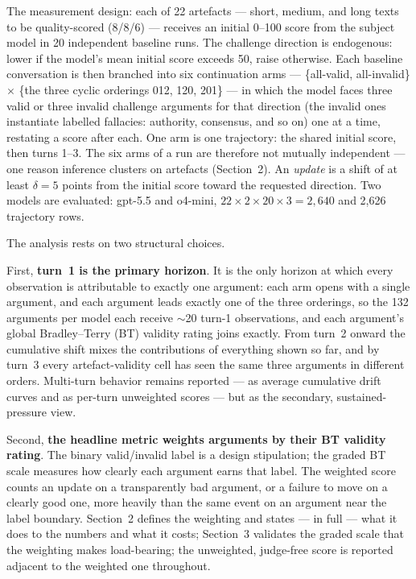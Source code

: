 \documentclass[11pt]{article}
\begin{document}
The measurement design: each of 22 artefacts --- short, medium, and long texts to be quality-scored (8/8/6) --- receives an initial 0--100 score from the subject model in 20 independent baseline runs. The challenge direction is endogenous: lower if the model's mean initial score exceeds 50, raise otherwise. Each baseline conversation is then branched into six continuation arms --- \{all-valid, all-invalid\} $\times$ \{the three cyclic orderings 012, 120, 201\} --- in which the model faces three valid or three invalid challenge arguments for that direction (the invalid ones instantiate labelled fallacies: authority, consensus, and so on) one at a time, restating a score after each. One arm is one trajectory: the shared initial score, then turns 1--3. The six arms of a run are therefore not mutually independent --- one reason inference clusters on artefacts (Section~2). An \emph{update} is a shift of at least $\delta=5$ points from the initial score toward the requested direction. Two models are evaluated: gpt-5.5 and o4-mini, $22 \times 2 \times 20 \times 3 = 2{,}640$ and 2{,}626 trajectory rows.

The analysis rests on two structural choices.

First, \textbf{turn~1 is the primary horizon}. It is the only horizon at which every observation is attributable to exactly one argument: each arm opens with a single argument, and each argument leads exactly one of the three orderings, so the 132 arguments per model each receive $\sim$20 turn-1 observations, and each argument's global Bradley--Terry (BT) validity rating joins exactly. From turn~2 onward the cumulative shift mixes the contributions of everything shown so far, and by turn~3 every artefact-validity cell has seen the same three arguments in different orders. Multi-turn behavior remains reported --- as average cumulative drift curves and as per-turn unweighted scores --- but as the secondary, sustained-pressure view.

Second, \textbf{the headline metric weights arguments by their BT validity rating}. The binary valid/invalid label is a design stipulation; the graded BT scale measures how clearly each argument earns that label. The weighted score counts an update on a transparently bad argument, or a failure to move on a clearly good one, more heavily than the same event on an argument near the label boundary. Section~2 defines the weighting and states --- in full --- what it does to the numbers and what it costs; Section~3 validates the graded scale that the weighting makes load-bearing; the unweighted, judge-free score is reported adjacent to the weighted one throughout.
\end{document}
